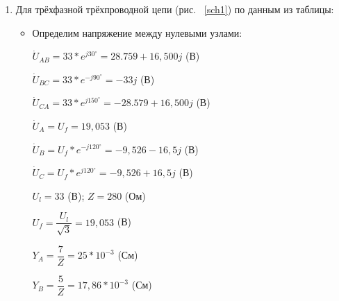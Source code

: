 \begin{enumerate}
\item Для трёхфазной трёхпроводной цепи (рис. ~\ref{sch1}) по данным из таблицы:

\begin{itemize}
\item Определим напряжение между нулевыми узлами:\par

\begin{minipage}[h]{0.65\linewidth}

$ \dot{U}_{AB} = 33*e^{j30^{\circ}} = 28.759 + 16,500j $ (В)

\vspace{2mm}

$ \dot{U}_{BC} = 33*e^{-j90^{\circ}} = -33j $ (В)

\vspace{2mm}

$ \dot{U}_{CA} = 33*e^{j150^{\circ}} = -28.579 + 16,500j $ (В)

\vspace{2mm}

$ \dot{U}_{A} = U_{f} = 19,053 $ (В) 

\vspace{2mm}

$ \dot{U}_{B} = U_{f}*e^{-j120^{\circ}}  = -9,526 - 16,5j $ (В)

\vspace{2mm}

$ \dot{U}_{C} = U_{f}*e^{j120^{\circ}}  = -9,526 + 16,5j $ (В)

\vspace{2mm}



\end{minipage}    
\hfill
\begin{minipage}[h]{0.35\linewidth}

$ U_{l} = 33 $ (В); \hspace{4mm} $ Z = 280 $ (Ом)

\vspace{2mm}

$ U_{f} = \dfrac{U_{l}}{\sqrt{3}} = 19,053 $ (В)

\vspace{2mm}

$ Y_{A} = \dfrac{7}{Z} = 25*10^{-3} $ (См) 

\vspace{2mm}

$ Y_{B} = \dfrac{5}{Z} = 17,86*10^{-3} $ (См) 


\end{minipage}
\end{itemize}
\end{enumerate}
